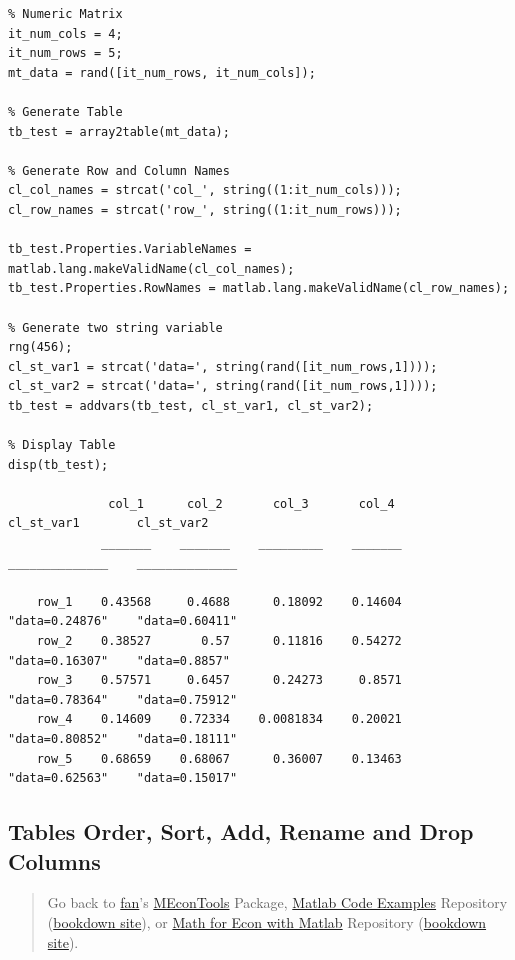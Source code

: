 \documentclass[
]{book}
\begin{document}
\begin{verbatim}
% Numeric Matrix
it_num_cols = 4;
it_num_rows = 5;
mt_data = rand([it_num_rows, it_num_cols]);

% Generate Table
tb_test = array2table(mt_data);

% Generate Row and Column Names
cl_col_names = strcat('col_', string((1:it_num_cols)));
cl_row_names = strcat('row_', string((1:it_num_rows)));

tb_test.Properties.VariableNames = matlab.lang.makeValidName(cl_col_names);
tb_test.Properties.RowNames = matlab.lang.makeValidName(cl_row_names);

% Generate two string variable
rng(456);
cl_st_var1 = strcat('data=', string(rand([it_num_rows,1])));
cl_st_var2 = strcat('data=', string(rand([it_num_rows,1])));
tb_test = addvars(tb_test, cl_st_var1, cl_st_var2);

% Display Table
disp(tb_test);

              col_1      col_2       col_3       col_4       cl_st_var1        cl_st_var2  
             _______    _______    _________    _______    ______________    ______________

    row_1    0.43568     0.4688      0.18092    0.14604    "data=0.24876"    "data=0.60411"
    row_2    0.38527       0.57      0.11816    0.54272    "data=0.16307"    "data=0.8857" 
    row_3    0.57571     0.6457      0.24273     0.8571    "data=0.78364"    "data=0.75912"
    row_4    0.14609    0.72334    0.0081834    0.20021    "data=0.80852"    "data=0.18111"
    row_5    0.68659    0.68067      0.36007    0.13463    "data=0.62563"    "data=0.15017"
\end{verbatim}

\hypertarget{tables-order-sort-add-rename-and-drop-columns}{%
\subsection{Tables Order, Sort, Add, Rename and Drop Columns}\label{tables-order-sort-add-rename-and-drop-columns}}

\begin{quote}
Go back to \href{http://fanwangecon.github.io/}{fan}'s \href{https://fanwangecon.github.io/MEconTools/}{MEconTools} Package, \href{https://fanwangecon.github.io/M4Econ/}{Matlab Code Examples} Repository (\href{https://fanwangecon.github.io/M4Econ/bookdown}{bookdown site}), or \href{https://fanwangecon.github.io/Math4Econ/}{Math for Econ with Matlab} Repository (\href{https://fanwangecon.github.io/Math4Econ/bookdown}{bookdown site}).
\end{quote}
\end{document}
